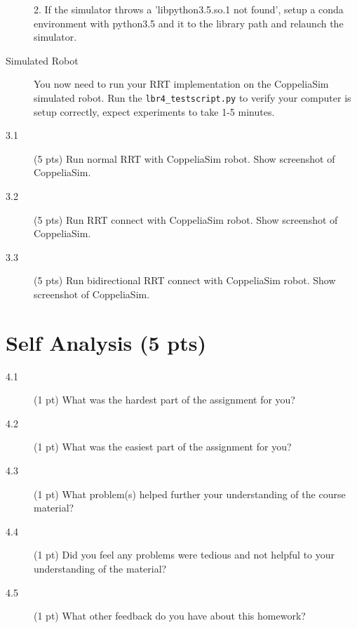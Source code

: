 \documentclass[11pt]{kuntz-hw}
\begin{document}
\begin{description}
2. If the simulator throws a 'libpython3.5.so.1 not found', setup a conda environment with python3.5 and it to the library path and relaunch the simulator.

\item[Simulated Robot] You now need to run your RRT implementation on the CoppeliaSim simulated robot. Run the \texttt{lbr4\_testscript.py} to verify your computer is setup correctly, expect experiments to take 1-5 minutes.


\item[3.1] (5 pts) Run normal RRT with CoppeliaSim robot. Show screenshot of CoppeliaSim.
\item[3.2] (5 pts) Run RRT connect with CoppeliaSim robot. Show screenshot of CoppeliaSim.
\item[3.3] (5 pts) Run bidirectional RRT connect with CoppeliaSim robot. Show screenshot of CoppeliaSim.
\end{description}

\section*{Self Analysis (5 pts)}
\begin{description}
\item[4.1] (1 pt) What was the hardest part of the assignment for you?
\item[4.2] (1 pt) What was the easiest part of the assignment for you?
\item[4.3] (1 pt) What problem(s) helped further your understanding of the course material?
\item[4.4] (1 pt) Did you feel any problems were tedious and not helpful to your understanding of the material?
\item[4.5] (1 pt) What other feedback do you have about this homework?
\end{description}
\end{document}
